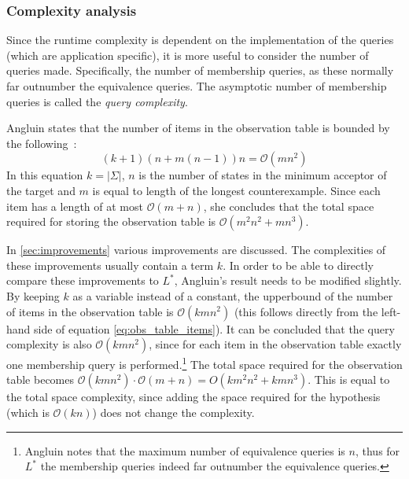 \subsubsection{Complexity analysis}
\label{sec:complexity-analysis-lstar}

Since the runtime complexity is dependent on the implementation of the queries
(which are application specific), it is more useful to consider the number of
queries made. Specifically, the number of membership queries, as these normally
far outnumber the equivalence queries. The asymptotic number of membership
queries is called the \textit{query complexity}.

Angluin states that the number of items in the observation table is bounded by
the following~\cite{Angluin1987}:
\begin{equation} \label{eq:obs_table_items}
(k+1)(n+m(n-1))n = \mathcal{O}(mn^2)
\end{equation}
In this equation $k = |\Sigma|$, $n$ is the number of states in the minimum
acceptor of the target and $m$ is equal to length of the longest
counterexample\cite{Angluin1987}. Since each item has a length of at most
$\mathcal{O}(m+n)$, she concludes that the total space required for storing the
observation table is $\mathcal{O}(m^2n^2 + mn^3)$.

In \cref{sec:improvements} various improvements are discussed. The complexities
of these improvements usually contain a term $k$. In order to be able to
directly compare these improvements to $L^*$, Angluin's result needs to be
modified slightly. By keeping $k$ as a variable instead of a constant, the
upperbound of the number of items in the observation table is
$\mathcal{O}(kmn^2)$ (this follows directly from the left-hand side of equation
\ref{eq:obs_table_items}). It can be concluded that the query complexity is also
$\mathcal{O}(kmn^2)$, since for each item in the observation table exactly one
membership query is performed.\footnote{Angluin notes that the maximum number of
equivalence queries is $n$, thus for $L^*$ the membership queries indeed far
outnumber the equivalence queries.} The total space required for the observation
table becomes $\mathcal{O}(kmn^2) \cdot \mathcal{O}(m+n) = O(km^2n^2 + kmn^3)$.
This is equal to the total space complexity, since adding the space required for
the hypothesis (which is $\mathcal{O}(kn)$) does not change the complexity.

